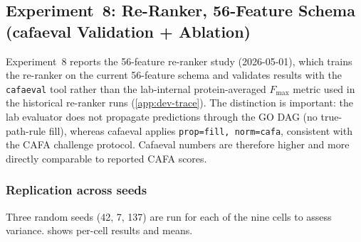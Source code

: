 \subsection{Experiment~8: Re-Ranker, 56-Feature Schema (cafaeval Validation + Ablation)}
\label{subsec:exp8-reranker-56f}

Experiment~8 reports the 56-feature re-ranker study (2026-05-01), which trains the
re-ranker on the current 56-feature schema and validates results with the
\texttt{cafaeval} tool rather than the lab-internal protein-averaged
$F_{\max}$ metric used in the historical re-ranker runs
(\cref{app:dev-trace}). The distinction is important:
the lab evaluator does not propagate predictions through the GO DAG (no
true-path-rule fill), whereas cafaeval applies \texttt{prop=fill,
norm=cafa}, consistent with the CAFA challenge protocol. Cafaeval numbers
are therefore higher and more directly comparable to reported CAFA scores.

\subsubsection{Replication across seeds}

Three random seeds (42, 7, 137) are run for each of the nine cells to
assess variance.  shows per-cell results and
means.

\begin{table}[htbp]
  \centering
  \caption[Re-ranker (56-feature) replication: lab Fmax (3 seeds)]{Re-ranker 56-feature schema replication: lab $F_{\max}$ (3 seeds).}
  \label{tab:exp8-replication}
\end{table}

